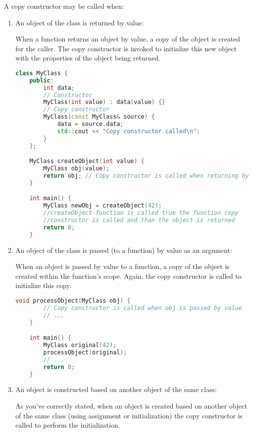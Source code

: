\documentclass{article}
\begin{document}
A copy constructor may be called when:

\begin{enumerate}
    \item An object of the class is returned by value:
    
    When a function returns an object by value, a copy of the object is created for the caller.
    The copy constructor is invoked to initialize this new object with the properties of the object being returned.
    
    \begin{lstlisting}[language=C++]
    class MyClass {
    public:
        int data;
        // Constructor
        MyClass(int value) : data(value) {}
        // Copy constructor
        MyClass(const MyClass& source) {
            data = source.data;
            std::cout << "Copy constructor called\n";
        }
    };

    MyClass createObject(int value) {
        MyClass obj(value);
        return obj; // Copy constructor is called when returning by value
    }

    int main() {
        MyClass newObj = createObject(42);  
        //createObject function is called true the function copy 
        //constructor is called and than the object is returned
        return 0;
    }
    \end{lstlisting}

    \item An object of the class is passed (to a function) by value as an argument:
    
    When an object is passed by value to a function, a copy of the object is created within the function's scope.
    Again, the copy constructor is called to initialize this copy.
    
    \begin{lstlisting}[language=C++]
    void processObject(MyClass obj) {
        // Copy constructor is called when obj is passed by value
        // ...
    }

    int main() {
        MyClass original(42);
        processObject(original);
        // ...
        return 0;
    }
    \end{lstlisting}

    \item An object is constructed based on another object of the same class:
    
    As you've correctly stated, when an object is created based on another object of the same class (using assignment or initialization)
    the copy constructor is called to perform the initialization.
    

\end{enumerate}
\end{document}
